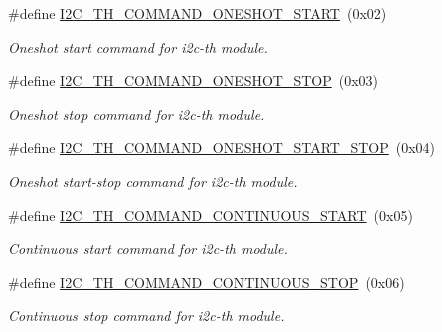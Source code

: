 \begin{DoxyCompactItemize}
\#define \hyperlink{registers-th_8h_a01ff8debbe24e2777d4669a05bba9aff}{I2\+C\+\_\+\+T\+H\+\_\+\+C\+O\+M\+M\+A\+N\+D\+\_\+\+O\+N\+E\+S\+H\+O\+T\+\_\+\+S\+T\+A\+RT}~(0x02)
\begin{DoxyCompactList}\small\item\em Oneshot start command for i2c-\/th module. \end{DoxyCompactList}\item 
\mbox{\label{registers-th_8h_a75c843dd544aae25cc6328327d357b90}} 
\#define \hyperlink{registers-th_8h_a75c843dd544aae25cc6328327d357b90}{I2\+C\+\_\+\+T\+H\+\_\+\+C\+O\+M\+M\+A\+N\+D\+\_\+\+O\+N\+E\+S\+H\+O\+T\+\_\+\+S\+T\+OP}~(0x03)
\begin{DoxyCompactList}\small\item\em Oneshot stop command for i2c-\/th module. \end{DoxyCompactList}\item 
\mbox{\label{registers-th_8h_af5fa530b0e40a9903afdf3a1c646b4d7}} 
\#define \hyperlink{registers-th_8h_af5fa530b0e40a9903afdf3a1c646b4d7}{I2\+C\+\_\+\+T\+H\+\_\+\+C\+O\+M\+M\+A\+N\+D\+\_\+\+O\+N\+E\+S\+H\+O\+T\+\_\+\+S\+T\+A\+R\+T\+\_\+\+S\+T\+OP}~(0x04)
\begin{DoxyCompactList}\small\item\em Oneshot start-\/stop command for i2c-\/th module. \end{DoxyCompactList}\item 
\mbox{\label{registers-th_8h_a51680f0c924ae23831dbd2a099f0e92f}} 
\#define \hyperlink{registers-th_8h_a51680f0c924ae23831dbd2a099f0e92f}{I2\+C\+\_\+\+T\+H\+\_\+\+C\+O\+M\+M\+A\+N\+D\+\_\+\+C\+O\+N\+T\+I\+N\+U\+O\+U\+S\+\_\+\+S\+T\+A\+RT}~(0x05)
\begin{DoxyCompactList}\small\item\em Continuous start command for i2c-\/th module. \end{DoxyCompactList}\item 
\mbox{\label{registers-th_8h_ae7a198cd962e2d0099c464eab6aae1d3}} 
\#define \hyperlink{registers-th_8h_ae7a198cd962e2d0099c464eab6aae1d3}{I2\+C\+\_\+\+T\+H\+\_\+\+C\+O\+M\+M\+A\+N\+D\+\_\+\+C\+O\+N\+T\+I\+N\+U\+O\+U\+S\+\_\+\+S\+T\+OP}~(0x06)
\begin{DoxyCompactList}\small\item\em Continuous stop command for i2c-\/th module. \end{DoxyCompactList}\item 

\end{DoxyCompactItemize}

